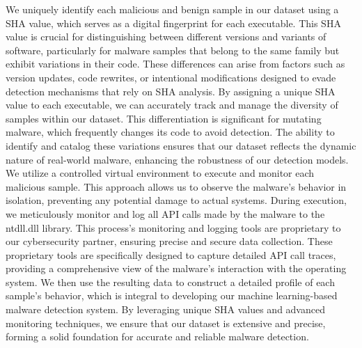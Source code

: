 We uniquely identify each malicious and benign sample in our dataset using a SHA value, which serves as a digital fingerprint for each executable.
This SHA value is crucial for distinguishing between different versions and variants of software, particularly for malware samples that belong to the same family but exhibit variations in their code. 
These differences can arise from factors such as version updates, code rewrites, or intentional modifications designed to evade detection mechanisms that rely on SHA analysis.
By assigning a unique SHA value to each executable, we can accurately track and manage the diversity of samples within our dataset. 
This differentiation is significant for mutating malware, which frequently changes its code to avoid detection. 
The ability to identify and catalog these variations ensures that our dataset reflects the dynamic nature of real-world malware, enhancing the robustness of our detection models.
We utilize a controlled virtual environment to execute and monitor each malicious sample. 
This approach allows us to observe the malware's behavior in isolation, preventing any potential damage to actual systems. 
During execution, we meticulously monitor and log all API calls made by the malware to the ntdll.dll library. 
This process's monitoring and logging tools are proprietary to our cybersecurity partner, ensuring precise and secure data collection.
These proprietary tools are specifically designed to capture detailed API call traces, providing a comprehensive view of the malware's interaction with the operating system. 
We then use the resulting data to construct a detailed profile of each sample's behavior, which is integral to developing our machine learning-based malware detection system. 
By leveraging unique SHA values and advanced monitoring techniques, we ensure that our dataset is extensive and precise, forming a solid foundation for accurate and reliable malware detection.

